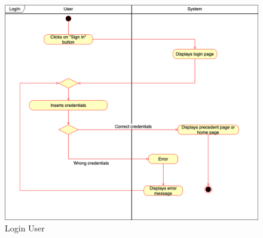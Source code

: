     \begin{figure}[h!]
        \centering
        \includegraphics[scale=0.35]{images/use_cases_diagram/user_login.png}
        \caption{Login User}
        \label{fig:user_login}
    \end{figure}
    \FloatBarrier
    
